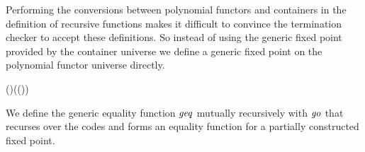 Performing the conversions between polynomial functors and containers in the
definition of recursive functions makes it difficult to convince the termination
checker to accept these definitions. So instead of using the generic fixed point
provided by the container universe we define a generic fixed point on the
polynomial functor universe directly.
\begin{hscode}\SaveRestoreHook
{}%
%
%
\>[3]{}\;\;(\mathbin{::})\mathrel{=}\;(\;\;(\;)){}\<[E]%
\ColumnHook
\end{hscode}\resethooks
We define the generic equality function \ensuremath{\Varid{geq}} mutually recursively
with \ensuremath{\Varid{go}} that recurses over the codes and forms an equality function
for a partially constructed fixed point.
